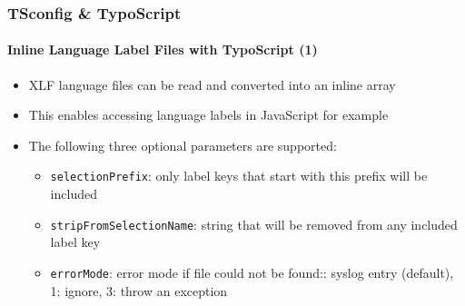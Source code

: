 \begin{frame}[fragile]
	\frametitle{TSconfig \& TypoScript}
	\framesubtitle{Inline Language Label Files with TypoScript (1)}

	\lstset{basicstyle=\tiny\ttfamily}

	\begin{itemize}

		\item XLF language files can be read and converted into an inline array

		\item This enables accessing language labels in JavaScript for example

		\item The following three optional parameters are supported:

			\begin{itemize}
				\item \texttt{selectionPrefix}:\newline
					only label keys that start with this prefix will be included
				\item \texttt{stripFromSelectionName}:\newline
					string that will be removed from any included label key
				\item \texttt{errorMode}:\newline
					error mode if file could not be found:: syslog entry (default), 1: ignore, 3: throw an exception
			\end{itemize}

	\end{itemize}

\end{frame}

